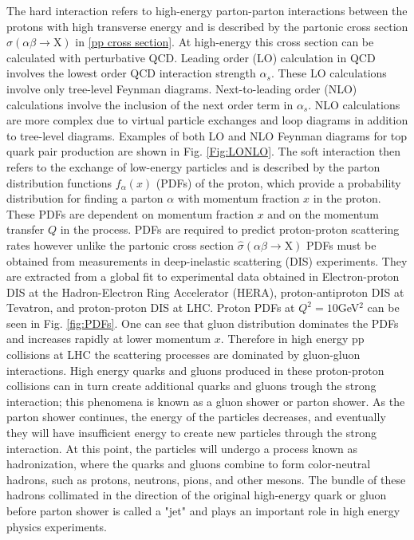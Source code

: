 The hard interaction refers to high-energy parton-parton interactions between the protons with high transverse energy and is described by the partonic cross section $\hat{\sigma}(\alpha \beta \to \text{X})$ in \ref{pp cross section}. At high-energy this cross section can be calculated with perturbative QCD. Leading order (LO) calculation in QCD involves the lowest order QCD interaction strength $\alpha_s$. These LO calculations involve only tree-level Feynman diagrams. Next-to-leading order (NLO) calculations involve the inclusion of the next order term in $\alpha_s$. NLO calculations are more complex due to virtual particle exchanges and loop diagrams in addition to tree-level diagrams. Examples of both LO and NLO Feynman diagrams for top quark pair production are shown in Fig. \ref{Fig:LONLO}. 
The soft interaction then refers to the exchange of low-energy particles and is described by the parton distribution functions $f_\alpha(x)$ (PDFs) of the proton, which provide a probability distribution for finding a parton $\alpha$ with momentum fraction $x$ in the proton. These PDFs are dependent on momentum fraction $x$ and on the momentum transfer $Q$ in the process. PDFs are required to predict proton-proton scattering rates however unlike the partonic cross section $\hat{\sigma}(\alpha \beta \to \text{X})$ PDFs must be obtained from measurements in deep-inelastic scattering (DIS) experiments. They are extracted from a global fit to experimental data obtained in Electron-proton DIS at the Hadron-Electron Ring Accelerator (HERA), proton-antiproton DIS at Tevatron, and proton-proton DIS at LHC. Proton PDFs at $Q^2=10$GeV$^2$ can be seen in Fig. \ref{fig:PDFs}. One can see that gluon distribution dominates the PDFs and increases rapidly at lower momentum $x$. Therefore in high energy pp collisions at LHC the scattering processes are dominated by gluon-gluon interactions. High energy quarks and gluons produced in these proton-proton collisions can in turn create additional quarks and gluons trough the strong interaction; this phenomena is known as a gluon shower or parton shower. As the parton shower continues, the energy of the particles decreases, and eventually they will have insufficient energy to create new particles through the strong interaction. At this point, the particles will undergo a process known as hadronization, where the quarks and gluons combine to form color-neutral hadrons, such as protons, neutrons, pions, and other mesons. The bundle of these hadrons collimated in the direction of the original high-energy quark or gluon before parton shower is called a "jet" and plays an important role in high energy physics experiments.
